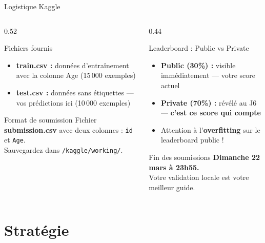 \documentclass[aspectratio=169, 10pt]{beamer}
\begin{document}
\begin{frame}{Logistique Kaggle}
  \begin{columns}[T]
    \begin{column}{0.52\textwidth}
      \begin{block}{Fichiers fournis}
        \begin{itemize}
          \item \textbf{train.csv :} données d'entraînement avec
                la colonne Age (15\,000 exemples)
          \item \textbf{test.csv :} données sans étiquettes ---
                vos prédictions ici (10\,000 exemples)
        \end{itemize}
      \end{block}
      \smallskip
      \begin{block}{Format de soumission}
        Fichier \textbf{submission.csv} avec deux colonnes :
        \texttt{id} et \texttt{Age}.\\[4pt]
        Sauvegardez dans \texttt{/kaggle/working/}.
      \end{block}
    \end{column}
    \begin{column}{0.44\textwidth}
      \begin{alertblock}{Leaderboard : Public vs Private}
        \begin{itemize}
          \item \textbf{Public (30\%) :} visible immédiatement
                --- votre score actuel
          \item \textbf{Private (70\%) :} révélé au J6 ---
                \textbf{c'est ce score qui compte}
          \item Attention à l'\textbf{overfitting} sur le
                leaderboard public !
        \end{itemize}
      \end{alertblock}
      \smallskip
      \begin{exampleblock}{Fin des soumissions}
        \textbf{Dimanche 22 mars à 23h55.}\\
        Votre validation locale est votre meilleur guide.
      \end{exampleblock}
    \end{column}
  \end{columns}
\end{frame}

\section{Stratégie}
\end{document}
